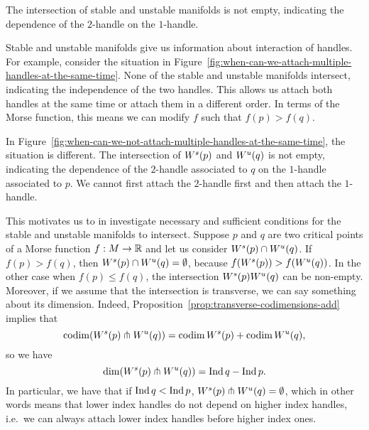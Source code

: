 \begin{marginfigure}
    \centering
    \caption{The intersection of stable and unstable manifolds is not empty, indicating the dependence of the $2$-handle on the $1$-handle.}
    \label{fig:when-can-we-not-attach-multiple-handles-at-the-same-time}
\end{marginfigure}
    Stable and unstable manifolds give us information about interaction of handles.
    For example, consider the situation in Figure~\ref{fig:when-can-we-attach-multiple-handles-at-the-same-time}.
    None of the stable and unstable manifolds intersect,
    indicating the independence of the two handles.
    This allows us attach both handles at the same time or attach them in a different order.
    In terms of the Morse function,
    this means we can modify $f$ such that  $f(p) > f(q)$.

    In Figure~\ref{fig:when-can-we-not-attach-multiple-handles-at-the-same-time}, the situation is different. The intersection of $W^s(p)$ and  $W^u(q)$ is not empty, indicating the dependence of the  $2$-handle associated to $q$ on the $1$-handle associated to $p$. We cannot first attach the $2$-handle first and then attach the $1$-handle.

    This motivates us to in investigate necessary and sufficient conditions for the stable and unstable manifolds to intersect.
    Suppose $p$ and $q$ are two critical points of a Morse function $f: M \to  \mathbb{R}$ and let us consider $W^s(p) \cap W^u(q)$.
    If $f(p) > f(q)$, then  $W^s(p) \cap W^u(q) = \emptyset$, because $f(W^s(p)) > f(W^u(q))$.
    In the other case when $f(p) \le  f(q)$, the intersection $W^s(p) W^u(q)$ can be non-empty.
    Moreover, if we assume that the intersection is transverse, we can say something about its dimension.
    Indeed, Proposition~\ref{prop:transverse-codimensions-add} implies that
    \[
        \operatorname{codim}(W^s(p) \pitchfork  W^u(q)) = \operatorname{codim} W^s(p) + \operatorname{codim} W^u(q)
    ,\] 
    so we have
    \[
        \dim(W^s(p) \pitchfork W^u(q)) = \operatorname{Ind} q - \operatorname{Ind} p
    .\]
    In particular, we have that if $\operatorname{Ind} q < \operatorname{Ind} p$,  $W^s(p) \pitchfork W^u(q) = \emptyset$, which in other words means that lower index handles do not depend on higher index handles, i.e.\ we can always attach lower index handles before higher index ones.


